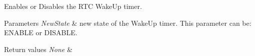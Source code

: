 Enables or Disables the R\+T\+C Wake\+Up timer. 


\begin{DoxyParams}{Parameters}
{\em New\+State} & new state of the Wake\+Up timer. This parameter can be\+: E\+N\+A\+B\+L\+E or D\+I\+S\+A\+B\+L\+E. \\
\hline
\end{DoxyParams}

\begin{DoxyRetVals}{Return values}
{\em None} & \\
\hline
\end{DoxyRetVals}
